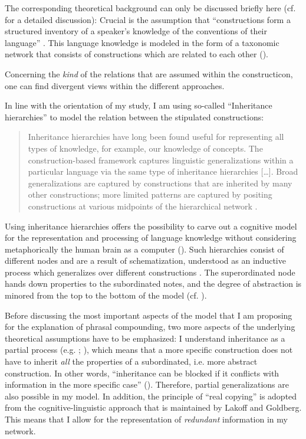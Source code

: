 \documentclass[output=paper]{LSP/langsci}
\begin{document}
The corresponding theoretical background can only be discussed briefly here (cf. \citealt[Chapter II.2.1.3.6]{Hein2015} for a detailed discussion): Crucial is the assumption that ``constructions form a structured inventory of a speaker’s knowledge of the conventions of their language'' \citep[25]{Croft2001}. This language knowledge is modeled in the form of  a taxonomic network that consists of constructions which are related to each other (\citealt[95]{ZiemLasch2013}).

Concerning the \textit{kind} of the relations that are assumed within the constructicon, one can find divergent views within the different  approaches.

In line with the  orientation of my study, I am using so-called ``Inheritance hierarchies” \citep[222]{Goldberg2003} to model the relation between the stipulated constructions:

\begin{quote}
Inheritance hierarchies have long been found useful for representing all types of knowledge, for example, our knowledge of concepts. The construc\-tion-based framework captures linguistic generalizations within a particular language via the same type of inheritance hierarchies […]. Broad generalizations are captured by constructions that are inherited by many other constructions; more limited patterns are captured by positing constructions at various midpoints of the hierarchical network \citep[222]{Goldberg2003}.
\end{quote}
Using inheritance hierarchies offers the possibility to carve out a cognitive model for the re\-presentation and processing of language knowledge without considering metaphorically the human brain as a computer  (\citealt[97]{ZiemLasch2013}). Such hierarchies consist of different nodes and are a result of schematization, understood as an inductive process which generalizes over different constructions \citep[49]{Deppermann2006}.  The superordinated node hands down properties to the subordinated notes, and the degree of abstraction is minored from the top to the bottom of the model (cf. \citealt[98]{ZiemLasch2013}).  

Before discussing the most important aspects of the model that I am proposing for the explanation of phrasal compounding, two more aspects of the underlying theoretical assumptions have to be emphasized: I understand inheritance as a partial process (e.g. \citealt{Goldberg1995}; \citealt{Lakoff1987}), which means that a more specific construction does not have to inherit \textit{all} the properties of a subordinated, i.e. more abstract construction. In other words, ``inheritance can be blocked if it conflicts with information in the more specific case” (\citealt[276]{Croft2004}). Therefore, partial generalizations are also possible in my model. In addition, the principle of ``real copying'' is adopted from the cognitive-linguistic approach that is maintained by Lakoff and Goldberg. This means that I allow for the representation of \textit{redundant} information in my network. 
\end{document}
